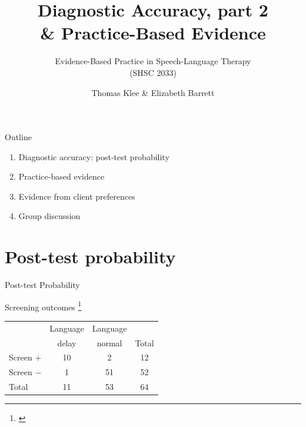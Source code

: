 \documentclass{beamer}
\title{Diagnostic Accuracy, part 2 \\ \& Practice-Based Evidence}
\subtitle{}
\author{Evidence-Based Practice in Speech-Language Therapy \\ (SHSC 2033)}
\institute{Session 9}
\date{Thomas Klee \& Elizabeth Barrett}
\begin{document}
\begin{frame}
	\titlepage
\end{frame}

% 
\begin{frame}{Outline}
	\begin{enumerate}
	\item Diagnostic accuracy: post-test probability
	\item Practice-based evidence
	\item Evidence from client preferences
	\item Group discussion
	\end {enumerate}
\end{frame}

\section{Post-test probability}

% 
\begin{frame}
	\begin{center}
	\huge{Post-test Probability}
	\end{center}
\end{frame}

% 
\begin{frame}{Screening outcomes \footnote{\tiny{\citet{Klee2000}}}}
\begin{center}
\begin{tabular}{l | c | c | c}
\toprule
& Language & Language & \\
& delay & normal & Total \\ 
\hline
Screen $+$ & 10 & 2 & 12 \\
\hline
Screen $-$ & 1 & 51 & 52 \\
\hline
Total & 11 & 53 & 64 \\
\bottomrule
\end{tabular}
\end{center}
\end{frame}
\end{document}
